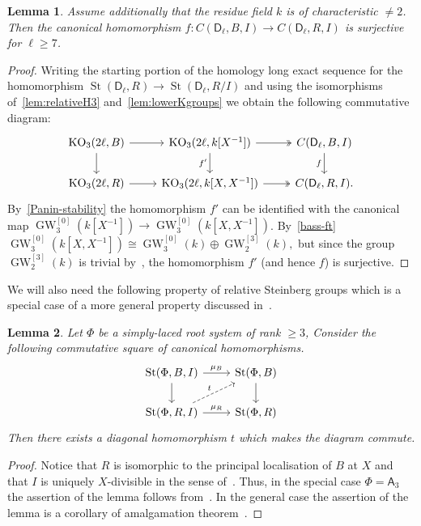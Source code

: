 \documentclass[10pt,a4paper,twoside]{article}
\newtheorem{lemma}{Lemma}
\theoremstyle{remark}
\theoremstyle{definition}
\numberwithin{lemma}{section}
\numberwithin{prop}{section}
\numberwithin{corollary}{section}
\numberwithin{externaltheorem}{section}
\DeclareMathOperator{\St}{St}
\DeclareMathOperator{\KO}{KO}
\DeclareMathOperator{\GW}{GW}
\newcommand{\rA}{\mathsf{A}}
\newcommand{\rD}{\mathsf{D}}
\numberwithin{equation}{section}
\begin{document}
\begin{lemma} \label{lem:prop41}
Assume additionally that the residue field $k$ is of characteristic $\neq 2$.
Then the canonical homomorphism $f\colon C(\rD_\ell, B, I) \to C(\rD_\ell, R, I)$ is surjective for $\ell \geq 7$. \end{lemma}
\begin{proof}
Writing the starting portion of the homology long exact sequence for the homomorphism $\St(\rD_\ell, R) \to \St(\rD_\ell, R/I)$ 
and using the isomorphisms of~\cref{lem:relativeH3} and~\cref{lem:lowerKgroups} we obtain the following commutative diagram:
\[\begin{tikzcd} \KO_3(2\ell, B) \arrow{r} \arrow{d} & \KO_3(2\ell, k[X^{-1}]) \arrow{d}[swap]{f'} \ar[r, twoheadrightarrow] & \ar{d}[swap]{f} C(\rD_\ell, B, I) \\
 \KO_3(2\ell, R) \arrow{r} & \KO_3(2\ell, k[X, X^{-1}]) \ar[r, twoheadrightarrow] & C(\rD_\ell, R, I). \end{tikzcd} \]
By~\cref{Panin-stability} the homomorphism $f'$ can be identified with the canonical map $\GW_3^{[0]}(k[X^{-1}]) \to \GW_3^{[0]}(k[X, X^{-1}])$.
By~\cref{bass-ft} $\GW_3^{[0]}(k[X, X^{-1}]) \cong \GW_3^{[0]}(k) \oplus \GW_2^{[3]}(k),$
but since the group $\GW_2^{[3]}(k)$ is trivial by~\cite[Lemma~2.2]{FRS12}, the homomorphism $f'$ (and hence $f$) is surjective.
\end{proof} 
 
We will also need the following property of relative Steinberg groups which is a special case of a more general property discussed in~\cite[\S~2]{LS17}.
\begin{lemma}\label{lem:lemma32} Let $\Phi$ be a simply-laced root system of rank $\geq 3$,
Consider the following commutative square of canonical homomorphisms.
\[\begin{tikzcd} \St(\Phi, B, I) \arrow{r}{\mu_B} \arrow{d} & \St(\Phi, B) \arrow{d} \\ \St(\Phi, R, I) \arrow{r}{\mu_R} \ar[ur, "t", dashrightarrow] & \St(\Phi, R) \end{tikzcd} \]
Then there exists a diagonal homomorphism $t$ which makes the diagram commute.   
\end{lemma} 
\begin{proof}
 Notice that $R$ is isomorphic to the principal localisation of $B$ at $X$
  and that $I$ is uniquely $X$-divisible in the sense of~\cite[\S~4]{LS17}.
 Thus, in the special case $\Phi = \rA_3$ the assertion of the lemma follows from~\cite[Theorem~3]{LS17}.
 In the general case the assertion of the lemma is a corollary of amalgamation theorem~\cite[Theorem~9]{S15}.
\end{proof}
\end{document}

